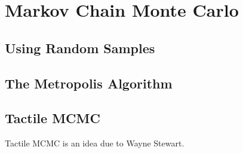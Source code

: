 \chapter{Markov Chain Monte Carlo}

\section{Using Random Samples}

\section{The Metropolis Algorithm}

\section{Tactile MCMC}

Tactile MCMC is an idea due to Wayne Stewart.
